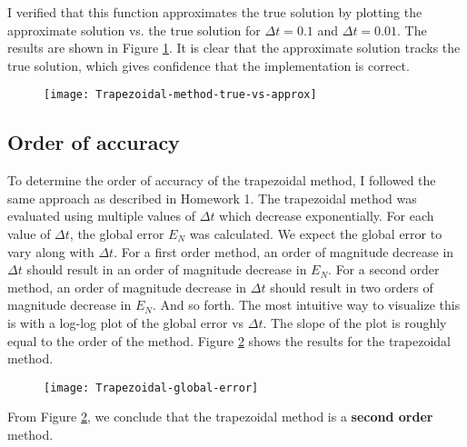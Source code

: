 \documentclass{article}
\begin{document}
I verified that this function approximates the true solution by plotting the approximate solution vs. the true solution for \(\Delta t = 0.1\) and \(\Delta t = 0.01\).  The results are shown in Figure \ref{fig:trapezoidal-approx}.  It is clear that the approximate solution tracks the true solution, which gives confidence that the implementation is correct.
\begin{figure}[H]
	\centering
	\texttt{[image: Trapezoidal-method-true-vs-approx]}
	\caption{}
	\label{fig:trapezoidal-approx}
\end{figure}
\subsection{Order of accuracy} \label{section:trapezoidal-accuracy}
To determine the order of accuracy of the trapezoidal method, I followed the same approach as described in Homework 1. The trapezoidal method was evaluated using multiple values of $\Delta t$ which decrease exponentially.  For each value of $\Delta t$, the global error $E_N$ was calculated.  We expect the global error to vary along with $\Delta t$.  For a first order method, an order of magnitude decrease in $\Delta t$ should result in an order of magnitude decrease in $E_N$.  For a second order method, an order of magnitude decrease in $\Delta t$ should result in two orders of magnitude decrease in $E_N$.  And so forth.  The most intuitive way to visualize this is with a log-log plot of the global error vs $\Delta t$.  The slope of the plot is roughly equal to the order of the method.  Figure \ref{fig:trapezoidal-global-error} shows the results for the trapezoidal method.
\begin{figure}[H]
	\centering
	\texttt{[image: Trapezoidal-global-error]}
	\caption{}
	\label{fig:trapezoidal-global-error}
\end{figure}
From Figure \ref{fig:trapezoidal-global-error}, we conclude that the trapezoidal method is a \textbf{second order} method.
\end{document}
